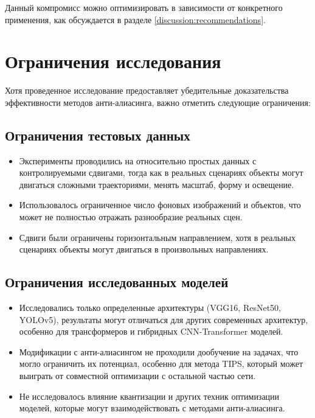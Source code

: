 Данный компромисс можно оптимизировать в зависимости от конкретного применения, как обсуждается в разделе \ref{discussion:recommendations}.

\section{Ограничения исследования}
\label{discussion:limitations}

Хотя проведенное исследование предоставляет убедительные доказательства эффективности методов анти-алиасинга, важно отметить следующие ограничения:

\subsection{Ограничения тестовых данных}
\label{discussion:limitations:data}

\begin{itemize}
    \item Эксперименты проводились на относительно простых данных с контролируемыми сдвигами, тогда как в реальных сценариях объекты могут двигаться сложными траекториями, менять масштаб, форму и освещение.
    
    \item Использовалось ограниченное число фоновых изображений и объектов, что может не полностью отражать разнообразие реальных сцен.
    
    \item Сдвиги были ограничены горизонтальным направлением, хотя в реальных сценариях объекты могут двигаться в произвольных направлениях.
\end{itemize}

\subsection{Ограничения исследованных моделей}
\label{discussion:limitations:models}

\begin{itemize}
    \item Исследовались только определенные архитектуры (VGG16, ResNet50, YOLOv5), результаты могут отличаться для других современных архитектур, особенно для трансформеров и гибридных CNN-Transformer моделей.
    
    \item Модификации с анти-алиасингом не проходили дообучение на задачах, что могло ограничить их потенциал, особенно для метода TIPS, который может выиграть от совместной оптимизации с остальной частью сети.
    
    \item Не исследовалось влияние квантизации и других техник оптимизации моделей, которые могут взаимодействовать с методами анти-алиасинга.
\end{itemize}

